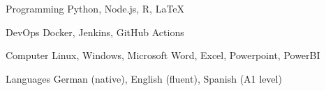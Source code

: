 

\begin{cvskills}

  \cvskill
    {Programming} %
    {Python, Node.js, R, LaTeX} %

  \cvskill
    {DevOps} %
    {Docker, Jenkins, GitHub Actions} %

  \cvskill
    {Computer} %
    {Linux, Windows, Microsoft Word, Excel, Powerpoint, PowerBI} %

  \cvskill
    {Languages} %
    {German (native), English (fluent), Spanish (A1 level)} %


\end{cvskills}
